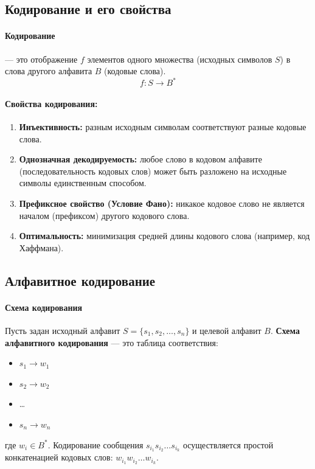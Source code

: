 \subsection*{Кодирование и его свойства}

\paragraph{Кодирование} — это отображение $f$ элементов одного множества (исходных символов $S$) в слова другого алфавита $B$ (кодовые слова).
$$f: S \to B^*$$

\paragraph{Свойства кодирования:}
\begin{enumerate}
    \item \textbf{Инъективность:} разным исходным символам соответствуют разные кодовые слова.
    \item \textbf{Однозначная декодируемость:} любое слово в кодовом алфавите (последовательность кодовых слов) может быть разложено на исходные символы единственным способом.
    \item \textbf{Префиксное свойство (Условие Фано):} никакое кодовое слово не является началом (префиксом) другого кодового слова.
    \item \textbf{Оптимальность:} минимизация средней длины кодового слова (например, код Хаффмана).
\end{enumerate}

\subsection*{Алфавитное кодирование}

\paragraph{Схема кодирования}
Пусть задан исходный алфавит $S = \{s_1, s_2, \dots, s_n\}$ и целевой алфавит $B$. \textbf{Схема алфавитного кодирования} — это таблица соответствия:
\begin{itemize}
    \item $s_1 \to w_1$
    \item $s_2 \to w_2$
    \item \dots
    \item $s_n \to w_n$
\end{itemize}
где $w_i \in B^*$. Кодирование сообщения $s_{i_1}s_{i_2}\dots s_{i_k}$ осуществляется простой конкатенацией кодовых слов: $w_{i_1}w_{i_2}\dots w_{i_k}$.


